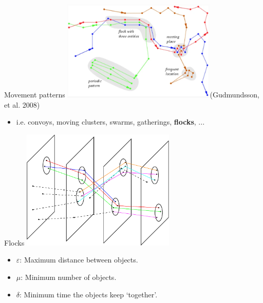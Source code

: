 \documentclass{beamer}
\begin{document}
    \begin{frame}{Movement patterns}
        \centering
        \includegraphics[width=0.55\textwidth]{figures/patterns}{\tiny (Gudmundsson, et al. 2008)}

        \begin{itemize} \item i.e. convoys, moving clusters, swarms, gatherings, \textbf{flocks}, ... \end{itemize} \vspace{0.5cm}
    \end{frame}

    \begin{frame}{Flocks}
        \centering
        \includegraphics[width=0.55\textwidth]{figures/flock}

        \begin{itemize}
            \item $\varepsilon$: Maximum distance between objects.
            \item $\mu$: Minimum number of objects.
            \item $\delta$: Minimum time the objects keep `together'.
        \end{itemize}
    \end{frame}
\end{document}
